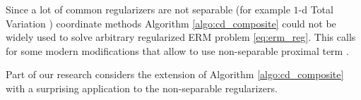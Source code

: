 Since a lot of common regularizers are not separable (for example $1$-d Total Variation \cite{bach2012optimization}) coordinate methods Algorithm \ref{algo:cd_composite} could not be widely used to solve arbitrary regularized ERM problem \eqref{eq:erm_reg}. This calls for some modern modifications that allow to use non-separable proximal term \cite{hanzely2018sega}. 

{{Part of our research considers the extension of Algorithm \ref{algo:cd_composite} with a surprising application to the non-separable regularizers.}}